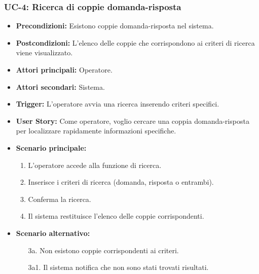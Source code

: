 \documentclass[a4paper, 12pt]{article}
\begin{document}
\subsubsection{UC-4: Ricerca di coppie domanda-risposta}
\begin{itemize}
    \item \textbf{Precondizioni:} Esistono coppie domanda-risposta nel sistema.
    \item \textbf{Postcondizioni:} L'elenco delle coppie che corrispondono ai criteri di ricerca viene visualizzato.
    \item \textbf{Attori principali:} Operatore.
    \item \textbf{Attori secondari:} Sistema.
    \item \textbf{Trigger:} L'operatore avvia una ricerca inserendo criteri specifici.
    \item \textbf{User Story:} Come operatore, voglio cercare una coppia domanda-risposta per localizzare rapidamente informazioni specifiche.
    \item \textbf{Scenario principale:}
    \begin{enumerate}
        \item L'operatore accede alla funzione di ricerca.
        \item Inserisce i criteri di ricerca (domanda, risposta o entrambi).
        \item Conferma la ricerca.
        \item Il sistema restituisce l'elenco delle coppie corrispondenti.
    \end{enumerate}
    \item \textbf{Scenario alternativo:}
    \begin{enumerate}
        \item[3a.] Non esistono coppie corrispondenti ai criteri.
        \item[3a1.] Il sistema notifica che non sono stati trovati risultati.
    \end{enumerate}
\end{itemize}
\end{document}

